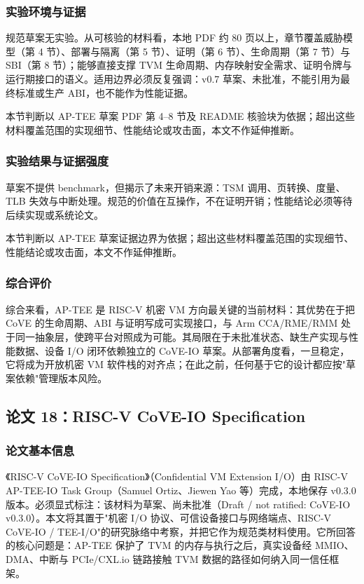 \documentclass[11pt]{ctexart}
\begin{document}
\subsubsection{实验环境与证据}
规范草案无实验。从可核验的材料看，本地 PDF 约 80 页以上，章节覆盖威胁模型（第 4 节）、部署与隔离（第 5 节）、证明（第 6 节）、生命周期（第 7 节）与 SBI（第 8 节）；能够直接支撑 TVM 生命周期、内存映射安全需求、证明令牌与运行期接口的语义。适用边界必须反复强调：v0.7 草案、未批准，不能引用为最终标准或生产 ABI，也不能作为性能证据。\par
本节判断以 AP-TEE 草案 PDF 第 4--8 节及 README 核验块为依据；超出这些材料覆盖范围的实现细节、性能结论或攻击面，本文不作延伸推断。\par
\subsubsection{实验结果与证据强度}
草案不提供 benchmark，但揭示了未来开销来源：TSM 调用、页转换、度量、TLB 失效与中断处理。规范的价值在互操作，不在证明开销；性能结论必须等待后续实现或系统论文。\par
本节判断以 AP-TEE 草案证据边界为依据；超出这些材料覆盖范围的实现细节、性能结论或攻击面，本文不作延伸推断。\par
\subsubsection{综合评价}
综合来看，AP-TEE 是 RISC-V 机密 VM 方向最关键的当前材料：其优势在于把 CoVE 的生命周期、ABI 与证明写成可实现接口，与 Arm CCA/RME/RMM 处于同一抽象层，使跨平台对照成为可能。其局限在于未批准状态、缺生产实现与性能数据、设备 I/O 闭环依赖独立的 CoVE-IO 草案。从部署角度看，一旦稳定，它将成为开放机密 VM 软件栈的对齐点；在此之前，任何基于它的设计都应按"草案依赖"管理版本风险。\par
\subsection{论文 18：RISC-V CoVE-IO Specification}
\subsubsection{论文基本信息}
《RISC-V CoVE-IO Specification》（Confidential VM Extension I/O）由 RISC-V AP-TEE-IO Task Group（Samuel Ortiz、Jiewen Yao 等）完成，本地保存 v0.3.0 版本。必须显式标注：该材料为草案、尚未批准（Draft / not ratified: CoVE-IO v0.3.0）。本文将其置于"机密 I/O 协议、可信设备接口与网络端点、RISC-V CoVE-IO / TEE-I/O"的研究脉络中考察，并把它作为规范类材料使用。它所回答的核心问题是：AP-TEE 保护了 TVM 的内存与执行之后，真实设备经 MMIO、DMA、中断与 PCIe/CXL.io 链路接触 TVM 数据的路径如何纳入同一信任框架。\cite{riscv_cove_io_2026}\par
\end{document}
